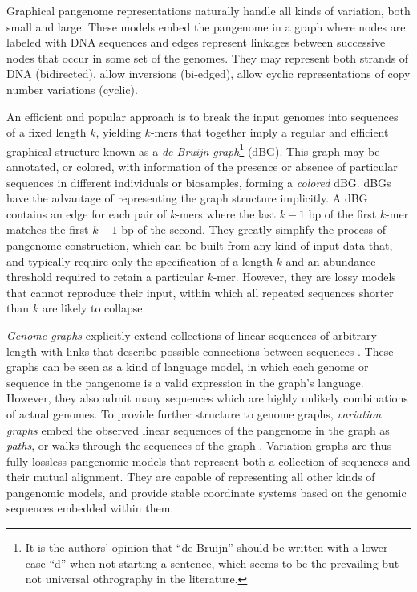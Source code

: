 Graphical pangenome representations naturally handle all kinds of variation, both small and large.
These models embed the pangenome in a graph where nodes are labeled with DNA sequences and edges represent linkages between successive nodes that occur in some set of the genomes.
They may represent both strands of DNA (bidirected), allow inversions (bi-edged), allow cyclic representations of copy number variations (cyclic).

An efficient and popular approach is to break the input genomes into sequences of a fixed length $k$, yielding $k$-mers that together imply a regular and efficient graphical structure known as a \emph{de Bruijn graph}\footnote{It is the authors' opinion that ``de Bruijn'' should be written with a lower-case ``d'' when not starting a sentence, which seems to be the prevailing but not universal othrography in the literature.} (dBG).
This graph may be annotated, or colored, with information of the presence or absence of particular sequences in different individuals or biosamples, forming a \emph{colored} dBG.
dBGs have the advantage of representing the graph structure implicitly.
A dBG contains an edge for each pair of $k$-mers where the last $k-1$ bp of the first $k$-mer matches the first $k-1$ bp of the second.
They greatly simplify the process of pangenome construction, which can be built from any kind of input data that, and typically require only the specification of a length $k$ and an abundance threshold required to retain a particular $k$-mer.
However, they are lossy models that cannot reproduce their input, within which all repeated sequences shorter than $k$ are likely to collapse.

\emph{Genome graphs} explicitly extend collections of linear sequences of arbitrary length with links that describe possible connections between sequences \cite{Paten_2017}.
These graphs can be seen as a kind of language model, in which each genome or sequence in the pangenome is a valid expression in the graph's language.
However, they also admit many sequences which are highly unlikely combinations of actual genomes.
To provide further structure to genome graphs, \emph{variation graphs} embed the observed linear sequences of the pangenome in the graph as \emph{paths}, or walks through the sequences of the graph \cite{Garrison_2018}.
Variation graphs are thus fully lossless pangenomic models that represent both a collection of sequences and their mutual alignment.
They are capable of representing all other kinds of pangenomic models, and provide stable coordinate systems based on the genomic sequences embedded within them.

